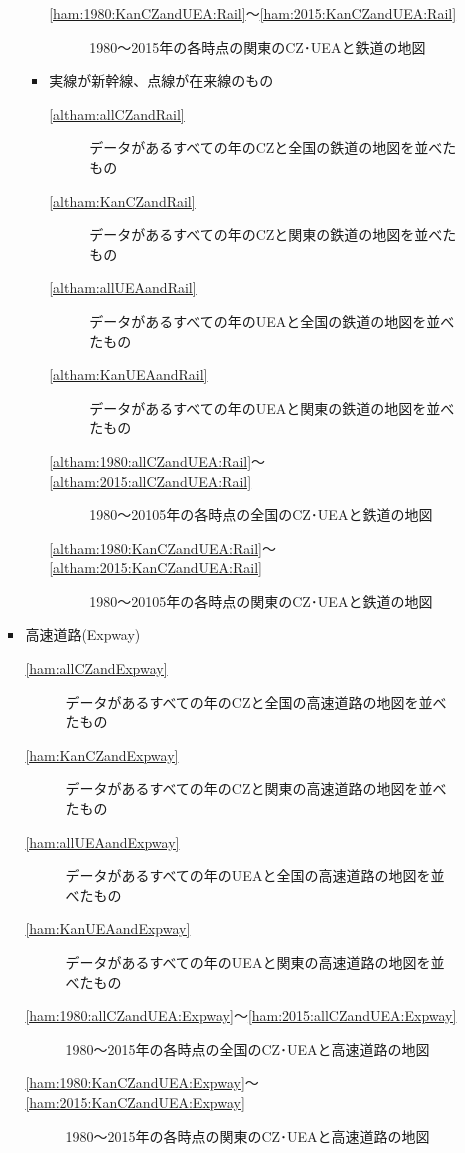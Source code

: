 \documentclass{ltjsarticle}
\begin{document}
\begin{itemize}
\begin{itemize}
\begin{itemize}
\begin{itemize}
\begin{description}
          \item[\ref{ham:1980:KanCZandUEA:Rail}～\ref{ham:2015:KanCZandUEA:Rail}] 1980～2015年の各時点の関東のCZ･UEAと鉄道の地図
        \end{description}
        \item 実線が新幹線、点線が在来線のもの
        \begin{description}
          \item[\ref{altham:allCZandRail}] データがあるすべての年のCZと全国の鉄道の地図を並べたもの
          \item[\ref{altham:KanCZandRail}] データがあるすべての年のCZと関東の鉄道の地図を並べたもの
          \item[\ref{altham:allUEAandRail}] データがあるすべての年のUEAと全国の鉄道の地図を並べたもの
          \item[\ref{altham:KanUEAandRail}] データがあるすべての年のUEAと関東の鉄道の地図を並べたもの
          \item[\ref{altham:1980:allCZandUEA:Rail}～\ref{altham:2015:allCZandUEA:Rail}] 1980～20105年の各時点の全国のCZ･UEAと鉄道の地図
          \item[\ref{altham:1980:KanCZandUEA:Rail}～\ref{altham:2015:KanCZandUEA:Rail}] 1980～20105年の各時点の関東のCZ･UEAと鉄道の地図
        \end{description}
      \end{itemize}      
      \item 高速道路(Expway)
      \begin{description}
        \item[\ref{ham:allCZandExpway}] データがあるすべての年のCZと全国の高速道路の地図を並べたもの
        \item[\ref{ham:KanCZandExpway}] データがあるすべての年のCZと関東の高速道路の地図を並べたもの
        \item[\ref{ham:allUEAandExpway}] データがあるすべての年のUEAと全国の高速道路の地図を並べたもの
        \item[\ref{ham:KanUEAandExpway}] データがあるすべての年のUEAと関東の高速道路の地図を並べたもの
        \item[\ref{ham:1980:allCZandUEA:Expway}～\ref{ham:2015:allCZandUEA:Expway}] 1980～2015年の各時点の全国のCZ･UEAと高速道路の地図
        \item[\ref{ham:1980:KanCZandUEA:Expway}～\ref{ham:2015:KanCZandUEA:Expway}] 1980～2015年の各時点の関東のCZ･UEAと高速道路の地図
      \end{description}
    \end{itemize}

  \end{itemize}
\end{itemize}
\end{document}
